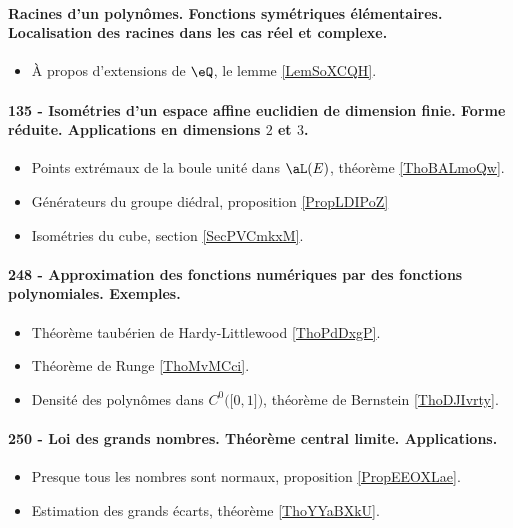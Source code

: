 \paragraph{Racines d’un polynômes. Fonctions symétriques élémentaires. Localisation des racines dans les cas réel et complexe.}
\begin{itemize}
    \item À propos d'extensions de \( \eQ\), le lemme \ref{LemSoXCQH}.
\end{itemize}

\paragraph{135 - Isométries d'un espace affine euclidien de dimension finie. Forme réduite. Applications en dimensions $2$ et $3$.}
\begin{itemize}
    \item Points extrémaux de la boule unité dans \( \aL(E)\), théorème \ref{ThoBALmoQw}.
    \item Générateurs du groupe diédral, proposition \ref{PropLDIPoZ}
    \item Isométries du cube, section \ref{SecPVCmkxM}.
\end{itemize}

\paragraph{248 - Approximation des fonctions numériques par des fonctions polynomiales. Exemples.}
\begin{itemize}
    \item Théorème taubérien de Hardy-Littlewood \ref{ThoPdDxgP}.
    \item Théorème de Runge \ref{ThoMvMCci}.
    \item Densité des polynômes dans \( C^0\big( \mathopen[ 0 , 1 \mathclose] \big)\), théorème de Bernstein \ref{ThoDJIvrty}.
\end{itemize}
\paragraph{250 - Loi des grands nombres. Théorème central limite. Applications.}
\begin{itemize}
    \item Presque tous les nombres sont normaux, proposition \ref{PropEEOXLae}.
    \item Estimation des grands écarts, théorème \ref{ThoYYaBXkU}.
\end{itemize}
